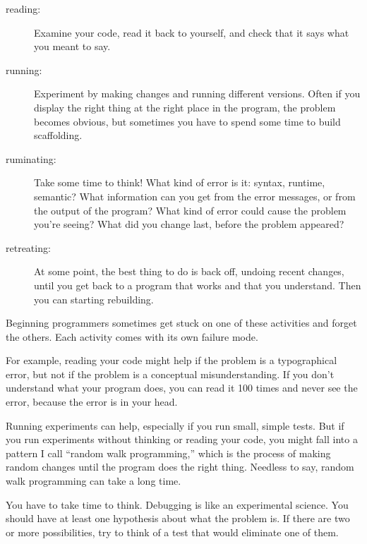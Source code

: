 \documentclass[10pt]{book}
\begin{document}
{\begin{description}

\item[reading:] Examine your code, read it back to yourself, and
check that it says what you meant to say.

\item[running:] Experiment by making changes and running different
versions.  Often if you display the right thing at the right place
in the program, the problem becomes obvious, but sometimes you have to
spend some time to build scaffolding.

\item[ruminating:] Take some time to think!  What kind of error
is it: syntax, runtime, semantic?  What information can you get from
the error messages, or from the output of the program?  What kind of
error could cause the problem you're seeing?  What did you change
last, before the problem appeared?

\item[retreating:] At some point, the best thing to do is back
off, undoing recent changes, until you get back to a program that
works and that you understand.  Then you can starting rebuilding.

\end{description}

Beginning programmers sometimes get stuck on one of these activities
and forget the others.  Each activity comes with its own failure
mode.


For example, reading your code might help if the problem is a
typographical error, but not if the problem is a conceptual
misunderstanding.  If you don't understand what your program does, you
can read it 100 times and never see the error, because the error is in
your head.


Running experiments can help, especially if you run small, simple
tests.  But if you run experiments without thinking or reading your
code, you might fall into a pattern I call ``random walk programming,''
which is the process of making random changes until the program
does the right thing.  Needless to say, random walk programming
can take a long time.


You have to take time to think.  Debugging is like an
experimental science.  You should have at least one hypothesis about
what the problem is.  If there are two or more possibilities, try to
think of a test that would eliminate one of them.

}
\end{document}

